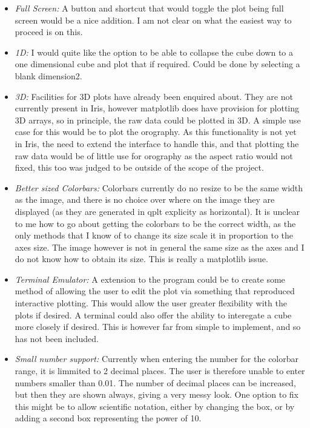 \documentclass[whitecover]{MO_report}
\begin{document}
\begin{itemize}
\item
\emph{Full Screen:} A button and shortcut that would toggle the plot being
full screen would be a nice addition. I am not clear on what the easiest way
to proceed is on this. 

\item
\emph{1D:} I would quite like the option to be able to collapse the cube down
to a one dimensional cube and plot that if required. Could be done by selecting
a blank dimension2. 

\item
\emph{3D:} Facilities for 3D plots have already been enquired about. They are
not currently present in Iris, however matplotlib does have provision for
plotting 3D arrays, so in principle, the raw data could be plotted in 3D.
A simple use case for this would be to plot the orography.
As this functionality is not yet in Iris, the need to extend the interface
to handle this, and that plotting the raw data would be of little use for
orography as the aspect ratio would not fixed, this too was judged to be
outside of the scope of the project.

\item
\emph{Better sized Colorbars:} Colorbars currently do no resize to be the same
width as the image, and there is no choice over where on the image they are
displayed (as they are generated in qplt explicity as horizontal). It is unclear
to me how to go about getting the colorbars to be the correct width, as the
only methods that I know of to change its size scale it in proportion to the
axes size. The image however is not in general the same size as the axes and I
do not know how to obtain its size. This is really a matplotlib issue.

\item
\emph{Terminal Emulator:} A extension to the program could be to create
some method of allowing the user to edit the plot via something that reproduced
interactive plotting. This would allow the user greater flexibility with the
plots if desired. A terminal could also offer the ability to interegate a cube
more closely if desired. This is however far from simple to implement, and so
has not been included.

\item
\emph{Small number support:} Currently when entering the number for the colorbar
range, it is limmited to 2 decimal places. The user is therefore unable to
enter numbers smaller than 0.01. The number of decimal places can be increased,
but then they are shown always, giving a very messy look. One option to fix this
might be to allow scientific notation, either by changing the box, or by adding
a second box representing the power of 10.


\end{itemize}
\end{document}
